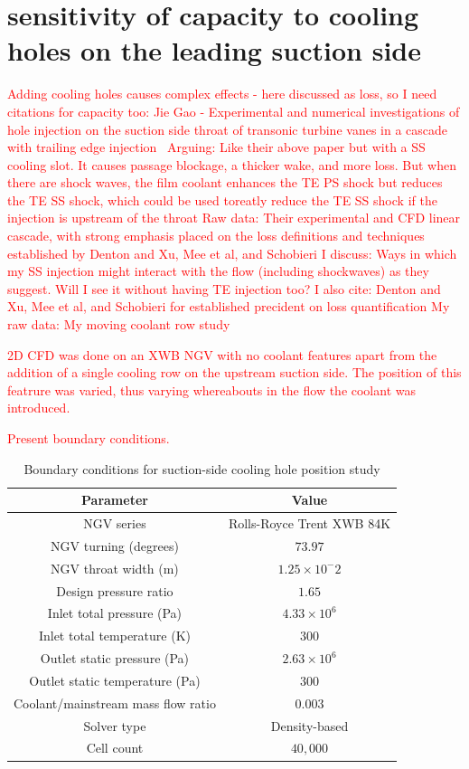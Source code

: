 \documentclass[a4paper, 11pt, oneside]{report}
\begin{document}
 
\section{sensitivity of capacity to cooling holes on the leading suction side}

\textcolor{red}{Adding cooling holes causes complex effects - here discussed as loss, so I need citations for capacity too:}
\textcolor{red}{Jie Gao - Experimental and numerical investigations of hole injection on the suction side throat of transonic turbine vanes in a cascade with trailing edge injection~\cite{gao_te_and_film_cooling}}
		\textcolor{red}{Arguing: Like their above paper but with a SS cooling slot. It causes passage blockage, a thicker wake, and more loss. But when there are shock waves, the film coolant enhances the TE PS shock but reduces the TE SS shock, which could be used toreatly reduce the TE SS shock if the injection is upstream of the throat}
		\textcolor{red}{Raw data: Their experimental and CFD linear cascade, with strong emphasis placed on the loss definitions and techniques established by Denton and Xu, Mee et al, and Schobieri}
		\textcolor{red}{I discuss: Ways in which my SS injection might interact with the flow (including shockwaves) as they suggest. Will I see it without having TE injection too?}
		\textcolor{red}{I also cite: Denton and Xu, Mee et al, and Schobieri for established precident on loss quantification}
		\textcolor{red}{My raw data: My moving coolant row study}

\textcolor{red}{2D CFD was done on an XWB NGV with no coolant features apart from the addition of a single cooling row on the upstream suction side. The position of this featrure was varied, thus varying whereabouts in the flow the coolant was introduced.}

\textcolor{red}{Present boundary conditions.}
\begin{table}[H]
\caption{Boundary conditions for suction-side cooling hole position study}
\label{SCH_parameters}
\begin{center}
\begin{tabular}{|c|c|}
\hline
Parameter & Value\\
\hline
NGV series & Rolls-Royce Trent XWB 84K\\
NGV turning (degrees) & $73.97$\\
NGV throat width (m) & $1.25 \times 10^-2$\\
Design pressure ratio & $1.65$\\
Inlet total pressure (Pa) & $4.33 \times 10^6$\\
Inlet total temperature (K) & $300$\\
Outlet static pressure (Pa) & $2.63 \times 10^6$\\
Outlet static temperature (Pa) & $300$\\
Coolant/mainstream mass flow ratio & $0.003$\\
Solver type & Density-based\\
Cell count & $40,000$\\
\hline
\end{tabular}
\end{center}
\end{table}
\end{document}
